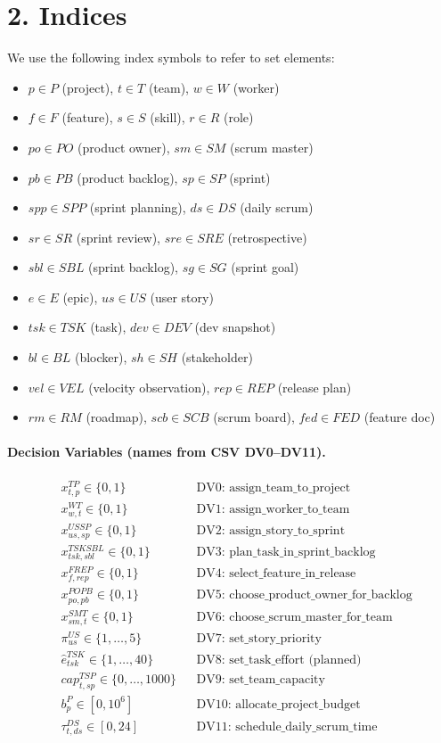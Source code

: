 \documentclass[11pt,a4paper]{article}
\begin{document}
\section{2. Indices}
We use the following index symbols to refer to set elements:
\begin{itemize}[leftmargin=2.2em]
  \item $p \in P$ (project), $t \in T$ (team), $w \in W$ (worker)
  \item $f \in F$ (feature), $s \in S$ (skill), $r \in R$ (role)
  \item $po \in PO$ (product owner), $sm \in SM$ (scrum master)
  \item $pb \in PB$ (product backlog), $sp \in SP$ (sprint)
  \item $spp \in SPP$ (sprint planning), $ds \in DS$ (daily scrum)
  \item $sr \in SR$ (sprint review), $sre \in SRE$ (retrospective)
  \item $sbl \in SBL$ (sprint backlog), $sg \in SG$ (sprint goal)
  \item $e \in E$ (epic), $us \in US$ (user story)
  \item $tsk \in TSK$ (task), $dev \in DEV$ (dev snapshot)
  \item $bl \in BL$ (blocker), $sh \in SH$ (stakeholder)
  \item $vel \in VEL$ (velocity observation), $rep \in REP$ (release plan)
  \item $rm \in RM$ (roadmap), $scb \in SCB$ (scrum board), $fed \in FED$ (feature doc)
\end{itemize}

\paragraph{Decision Variables (names from CSV DV0--DV11).}
\begin{align*}
&x^{TP}_{t,p} \in \{0,1\} &&\text{DV0: assign\_team\_to\_project} \\
&x^{WT}_{w,t} \in \{0,1\} &&\text{DV1: assign\_worker\_to\_team} \\
&x^{USSP}_{us,sp} \in \{0,1\} &&\text{DV2: assign\_story\_to\_sprint} \\
&x^{TSKSBL}_{tsk,sbl} \in \{0,1\} &&\text{DV3: plan\_task\_in\_sprint\_backlog} \\
&x^{FREP}_{f,rep} \in \{0,1\} &&\text{DV4: select\_feature\_in\_release} \\
&x^{POPB}_{po,pb} \in \{0,1\} &&\text{DV5: choose\_product\_owner\_for\_backlog} \\
&x^{SMT}_{sm,t} \in \{0,1\} &&\text{DV6: choose\_scrum\_master\_for\_team} \\
&\pi^{US}_{us} \in \{1,\dots,5\} &&\text{DV7: set\_story\_priority} \\
&\hat{e}^{TSK}_{tsk} \in \{1,\dots,40\} &&\text{DV8: set\_task\_effort (planned)} \\
&cap^{TSP}_{t,sp} \in \{0,\dots,1000\} &&\text{DV9: set\_team\_capacity} \\
&b^{P}_{p} \in [0,10^6] &&\text{DV10: allocate\_project\_budget} \\
&\tau^{DS}_{t,ds} \in [0,24] &&\text{DV11: schedule\_daily\_scrum\_time}
\end{align*}
\end{document}
